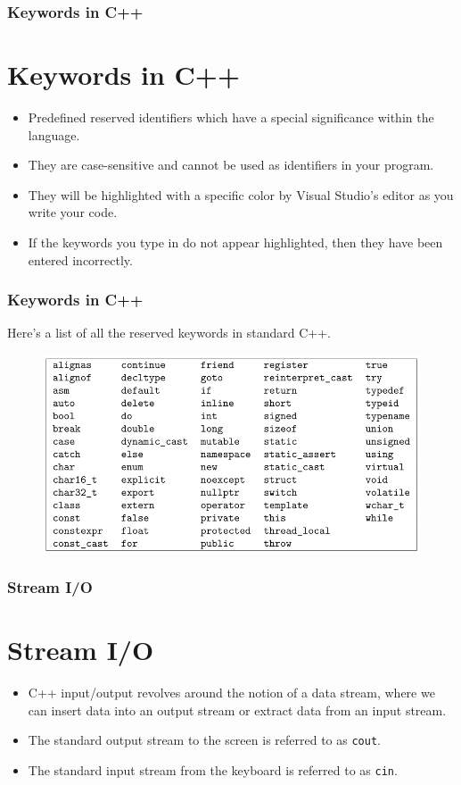 \documentclass{beamer}
\begin{document}
\begin{frame}
    \frametitle{Keywords in C++}
    \section{Keywords in C++} %
    \label{sec:keywords}
    \begin{itemize}
        \item Predefined reserved identifiers which have a special significance within the language.
        \item They are case-sensitive and cannot be used as identifiers in your program.
        \item They will be highlighted with a specific color by Visual Studio's editor as you write your code.
        \item If the keywords you type in do not appear highlighted, then they have been entered incorrectly.
    \end{itemize}
\end{frame}

\begin{frame}
    \frametitle{Keywords in C++}
    Here's a list of all the reserved keywords in standard C++.
    \begin{figure}
        \centering
        \includegraphics[scale=0.55]{keywords}
    \end{figure}
\end{frame}

\begin{frame}
    \frametitle{Stream I/O}
    \section{Stream I/O} %
    \label{sec:stream}
    \begin{itemize}
        \item C++ input/output revolves around the notion of a data stream, where we can insert data into an output stream or extract data from an input stream.
        \item The standard output stream to the screen is referred to as \texttt{cout}.
        \item The standard input stream from the keyboard is referred to as \texttt{cin}.
    \end{itemize}
\end{frame}
\end{document}
